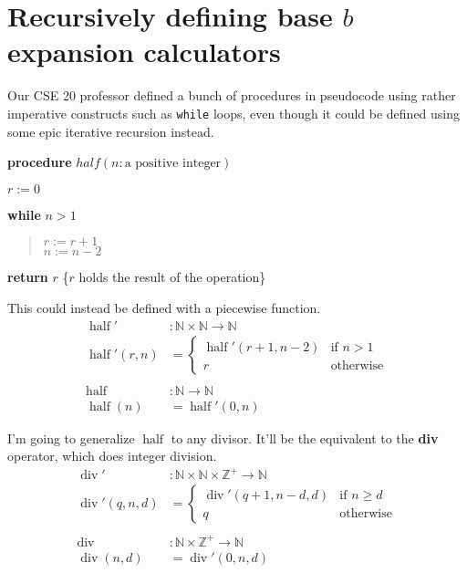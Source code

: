 \documentclass[a5paper, fleqn]{article}
\DeclareMathOperator{\half}{half}
\DeclareMathOperator{\Div}{div}
\newcommand{\nat}{\mathbb{N}}
\newcommand{\posint}{\mathbb{Z}^+}
\begin{document}
\section*{Recursively defining base $b$ expansion calculators}

Our CSE 20 professor defined a bunch of procedures in pseudocode using rather
imperative constructs such as \texttt{while} loops, even though it could be
defined using some epic iterative recursion instead.

\vspace{1em}

\begin{linenumbers}
  \textbf{procedure} $half(n: \text{a positive integer})$

  $r := 0$

  \textbf{while} $n > 1$

  \vspace{-1em}
  \begin{quote}
    $r := r + 1$ \\
    $n := n - 2$
  \end{quote}
  \vspace{-1em}

  \textbf{return} $r$ \{$r$ holds the result of the operation\}

\end{linenumbers}

\vspace{1em}

This could instead be defined with a piecewise function.
\begin{align*}
  \half'       & : \nat \times \nat \to \nat               \\
  \half'(r, n) & = \begin{cases}
                     \half'(r + 1, n - 2) & \text{if } n > 1 \\
                     r                    & \text{otherwise}
                   \end{cases} \\
  \\
  \half        & : \nat \to \nat                           \\
  \half(n)     & = \half'(0, n)
\end{align*}

I'm going to generalize $\half$ to any divisor. It'll be the equivalent to the
\textbf{div} operator, which does integer division.
\begin{align*}
  \Div'          & : \nat \times \nat \times \posint \to \nat    \\
  \Div'(q, n, d) & = \begin{cases}
                       \Div'(q + 1, n - d, d) & \text{if } n \ge d \\
                       q                      & \text{otherwise}
                     \end{cases} \\
  \\
  \Div           & : \nat \times \posint \to
  \nat                                                           \\
  \Div(n, d)     & = \Div'(0, n, d)
\end{align*}
\end{document}
